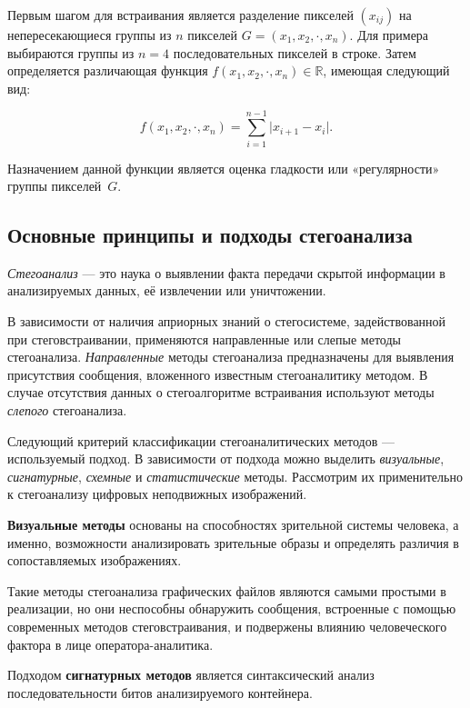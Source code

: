 Первым шагом для встраивания является разделение пикселей $ (x_{ij}) $ на непересекающиеся группы из $ n $ пикселей $ G = (x_1, x_2, \cdot, x_n) $. Для примера выбираются группы из $ n = 4 $ последовательных пикселей в строке. Затем определяется различающая функция $ f(x_1, x_2, \cdot, x_n) \in \mathbb{R} $, имеющая следующий вид:

\begin{equation*}
f(x_1, x_2, \cdot, x_n) = \sum_{i = 1}^{n - 1} \lvert x_{i + 1} - x_i \rvert.
\end{equation*}

Назначением данной функции является оценка гладкости или «регулярности» группы пикселей~$ G $.

\subsection{Основные принципы и подходы стегоанализа}

\textit{Стегоанализ} — это наука о выявлении факта передачи скрытой информации в анализируемых данных, её извлечении или уничтожении.

В зависимости от наличия априорных знаний о стегосистеме, задействованной при стеговстраивании, применяются направленные или слепые методы стегоанализа. \textit{Направленные} методы стегоанализа предназначены для выявления присутствия сообщения, вложенного известным стегоаналитику методом. В случае отсутствия данных о стегоалгоритме встраивания используют методы \textit{слепого} стегоанализа.

Следующий критерий классификации стегоаналитических методов --- используемый подход. В зависимости от подхода можно выделить \textit{визуальные}, \textit{сигнатурные}, \textit{схемные} и \textit{статистические} методы. Рассмотрим их применительно к стегоанализу цифровых неподвижных изображений.

\textbf{Визуальные методы} основаны на способностях зрительной системы человека, а именно, возможности анализировать зрительные образы и определять различия в сопоставляемых изображениях.

Такие методы стегоанализа графических файлов являются самыми простыми в реализации, но они неспособны обнаружить сообщения, встроенные с помощью современных методов стеговстраивания, и подвержены влиянию человеческого фактора в лице оператора-аналитика.

Подходом \textbf{сигнатурных методов} является синтаксический анализ последовательности битов анализируемого контейнера.

